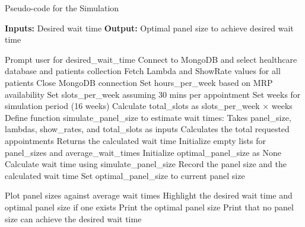\documentclass[11pt]{article}
\theoremstyle{definition}
\begin{document}
\newpage
\begin{algorithm}
\caption{Pseudo-code for the Simulation}
\begin{algorithmic}[1]

\State \textbf{Inputs:} Desired wait time
\State \textbf{Output:} Optimal panel size to achieve desired wait time

\Procedure{}{}
    \State Prompt user for desired\_wait\_time
    \State Connect to MongoDB and select healthcare database and patients collection
    \State Fetch Lambda and ShowRate values for all patients
    \State Close MongoDB connection
    \State Set hours\_per\_week based on MRP availability
    \State Set slots\_per\_week assuming 30 mins per appointment
    \State Set weeks for simulation period (16 weeks)
    \State Calculate total\_slots as slots\_per\_week $\times$ weeks
    \State Define function simulate\_panel\_size to estimate wait times:
    \State \hspace{\algorithmicindent} Takes panel\_size, lambdas, show\_rates, and total\_slots as inputs
    \State \hspace{\algorithmicindent} Calculates the total requested appointments
    \State \hspace{\algorithmicindent} Returns the calculated wait time
    \State Initialize empty lists for panel\_sizes and average\_wait\_times
    \State Initialize optimal\_panel\_size as None
        \State Calculate wait time using simulate\_panel\_size
        \State Record the panel size and the calculated wait time
            \State Set optimal\_panel\_size to current panel size
        \EndIf
    \EndFor

    \State Plot panel sizes against average wait times
    \State Highlight the desired wait time and optimal panel size if one exists
        \State Print the optimal panel size
    \Else
        \State Print that no panel size can achieve the desired wait time
    \EndIf
\EndProcedure
\end{algorithmic}
\end{algorithm}
\end{document}

